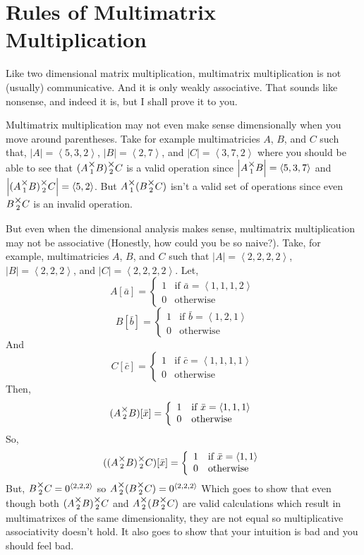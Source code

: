 \documentclass[12pt]{book}
\theoremstyle{plain}
\theoremstyle{definition}
\theoremstyle{ppart}
\theoremstyle{case}
\theoremstyle{solution}
\newcommand{\mmult}[1]{\text{\raisebox{1ex}{$\underset{#1}{\times}$}}}
\newcommand{\shape}[1]{\left|#1\right|}
\begin{document}
\section{Rules of Multimatrix Multiplication}

Like two dimensional matrix multiplication, multimatrix multiplication is
not (usually) communicative. And it is only weakly associative. That sounds like
nonsense, and indeed it is, but I shall prove it to you.

Multimatrix multiplication may not even make sense dimensionally when you move
around parentheses. Take for example multimatricies $A$, $B$, and $C$ such that,
$\shape{A} = \left<5,3,2\right>$,
$\shape{B} = \left<2,7\right>$, and
$\shape{C} = \left<3,7,2\right>$ where you should be able to see that
$(A \mmult{1} B) \mmult{2} C$ is a valid operation since
$\shape{A \mmult{1} B} = \left<5,3,7\right>$ and
$\shape{(A \mmult{1} B) \mmult{2} C} = \left<5,2\right>$. But
$A \mmult{1} (B \mmult{2} C)$ isn't a valid set of operations since even
$B \mmult{2} C$ is an invalid operation.

But even when the dimensional analysis makes sense, multimatrix multiplication
may not be associative (Honestly, how could you be so naive?). 
Take, for example, multimatricies $A$, $B$, and $C$ such
that $\shape{A} = \left<2,2,2,2\right>$, $\shape{B} = \left<2,2,2\right>$, and
$\shape{C} = \left<2,2,2,2\right>$. Let,
\[
 A[\bar{a}] = 
  \left\{
    \begin{array}{ll}
      1 & \mbox{if } \bar{a} = \left<1,1,1,2\right> \\
      0 & \mbox{otherwise}
    \end{array}
  \right.
\]
\[
 B[\bar{b}] = 
  \left\{
    \begin{array}{ll}
      1 & \mbox{if } \bar{b} = \left<1,2,1\right> \\
      0 & \mbox{otherwise}
    \end{array}
  \right.
\]
And
\[
 C[\bar{c}] = 
  \left\{
    \begin{array}{ll}
      1 & \mbox{if } \bar{c} = \left<1,1,1,1\right> \\
      0 & \mbox{otherwise}
    \end{array}
  \right.
\]
Then,
\[
 (A \mmult{2} B)[\bar{x}] = 
  \left\{
    \begin{array}{ll}
      1 & \mbox{if } \bar{x} = \left<1,1,1\right> \\
      0 & \mbox{otherwise}
    \end{array}
  \right.
\]
So,
\[
 ((A \mmult{2} B) \mmult{2} C)[\bar{x}] = 
  \left\{
    \begin{array}{ll}
      1 & \mbox{if } \bar{x} = \left<1,1\right> \\
      0 & \mbox{otherwise}
    \end{array}
  \right.
\]
But, $B \mmult{2} C = 0^{\left<2,2,2\right>}$ so $A \mmult{2} (B \mmult{2} C) = 0^{\left<2,2,2\right>}$
Which goes to show that even though both $(A \mmult{2} B) \mmult{2} C$ and
$A \mmult{2} (B \mmult{2} C)$ are valid calculations which result in multimatrixes
of the same dimensionality, they are not equal so multiplicative associativity
doesn't hold. It also goes to show that your intuition is bad and you should feel bad.
\end{document}
